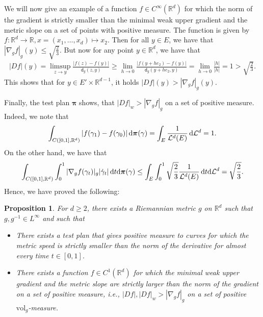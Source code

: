 \documentclass[a4paper,10pt]{article}
\newtheorem{proposition}[theorem]{Proposition}
\numberwithin{equation}{section}
\newcommand{\R}{\mathbb{R}}
\newcommand{\vol}{\mathrm{vol}}
\newcommand{\sfd}{\mathsf d}
\newcommand{\di}{{\rm d}}
\begin{document}
We will now give an example of a function $f\in C^\infty(\R^d)$ for which the norm of the gradient is strictly smaller than the minimal weak upper gradient and the metric slope on a set of points with positive measure. The function is given by $f: \R^d\to \R, x=(x_1, \ldots, x_d) \mapsto x_2$. Then for all $y\in E$, we have that $|\nabla_g f|_g(y) \leq \sqrt{\frac{2}{3}}$. But now for any point $y \in \R^d$, we have that 
\begin{align}
    |Df|(y) = \limsup_{z \to y} \frac{|f(z)-f(y)|}{\sfd_g(z, y)} \geq \lim_{h \to 0} \frac{|f(y+he_2)-f(y)|}{\sfd_g(y+he_2, y)} = \lim_{h \to 0} \frac{|h|}{|h|} = 1> \sqrt{\frac{2}{3}}.
\end{align}
This shows that for $y \in E' \times \R^{d-1}$, it holds $|Df|(y) > |\nabla_g f|_g(y)$. 

Finally, the test plan $\boldsymbol{\pi}$ shows, that $|Df|_w > |\nabla_g f|_g$ on a set of positive measure. Indeed, we note that 
\begin{align*}
    \int_{C([0,1], \R^d)} |f(\gamma_1)-f(\gamma_0)| \,\di \boldsymbol{\pi}(\gamma) = \int_{E} \frac{1}{\mathcal{L}^d(E)} \,\di \mathcal{L}^d = 1.
\end{align*}
On the other hand, we have that 
\begin{align*}
    \int_{C([0,1], \R^d)} \int_0^1 |\nabla_g f(\gamma_t)|_g |\dot{\gamma}_t| \, \di t \di \boldsymbol{\pi}(\gamma) \leq  \int_{E} \int_0^1 \sqrt{\frac{2}{3}} \frac{1}{\mathcal{L}^d(E)}\, \di t \di \mathcal{L}^d = \sqrt{\frac{2}{3}}.
\end{align*}
Hence, we have proved the following:
\smallskip

\begin{proposition}\label{first_counterexample}
    For $d \geq 2$, there exists a Riemannian metric $g$ on $\R^d$ such that $g, g^{-1} \in L^\infty$ and such that 
    \begin{itemize}
        \item[(i)] There exists a test plan that gives positive measure to curves for which the metric speed is strictly smaller than the norm of the derivative for almost every time $t \in [0,1]$. 
        \item[(ii)] There exists a function $f\in C^1(\R^d)$ for which the minimal weak upper gradient and the metric slope are strictly larger than the norm of the gradient on a set of positive measure, i.e., $|Df|, |Df|_w > |\nabla_g f|_g$ on a set of positive $\vol_g$-measure.
    \end{itemize}
\end{proposition}
\end{document}
